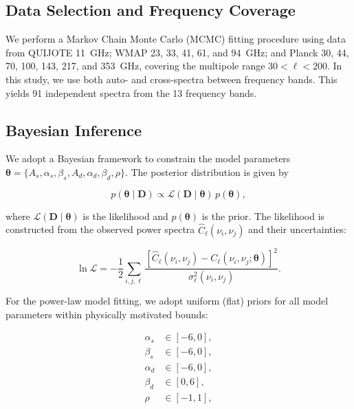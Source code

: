 \subsection{Data Selection and Frequency Coverage}

We perform a Markov Chain Monte Carlo (MCMC) fitting procedure using data from QUIJOTE 11~GHz; WMAP 23, 33, 41, 61, and 94~GHz; and Planck 30, 44, 70, 100, 143, 217, and 353~GHz, covering the multipole range $30 < \ell < 200$. In this study, we use both auto- and cross-spectra between frequency bands. This yields 91 independent spectra from the 13 frequency bands.

\subsection{Bayesian Inference}

We adopt a Bayesian framework to constrain the model parameters $\boldsymbol{\theta} = \{A_s, \alpha_s, \beta_s, A_d, \alpha_d, \beta_d, \rho\}$. The posterior distribution is given by

\begin{equation}
p(\boldsymbol{\theta} \mid \mathbf{D}) \propto \mathcal{L}(\mathbf{D} \mid \boldsymbol{\theta}) \, p(\boldsymbol{\theta}),
\end{equation}

where $\mathcal{L}(\mathbf{D} \mid \boldsymbol{\theta})$ is the likelihood and $p(\boldsymbol{\theta})$ is the prior. The likelihood is constructed from the observed power spectra $\hat{C}_\ell(\nu_i, \nu_j)$ and their uncertainties:

\begin{equation}
\ln \mathcal{L} = -\frac{1}{2} \sum_{i,j,\ell} \frac{[\hat{C}_\ell(\nu_i, \nu_j) - C_\ell(\nu_i, \nu_j; \boldsymbol{\theta})]^2}{\sigma^2_\ell(\nu_i, \nu_j)}.
\end{equation}

For the power-law model fitting, we adopt uniform (flat) priors for all model parameters within physically motivated bounds:

\begin{align}
    \alpha_s &\in [-6, 0], \\
    \beta_s &\in [-6, 0], \\
    \alpha_d &\in [-6, 0], \\
    \beta_d &\in [0, 6], \\
    \rho &\in [-1, 1],
\end{align}

